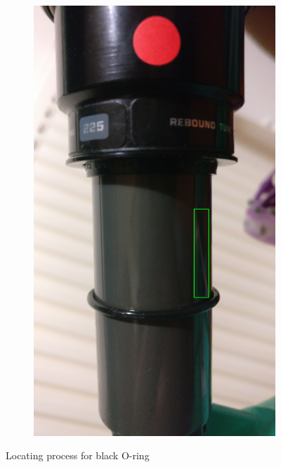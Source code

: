 \begin{figure}[h!]
\begin{subfigure}[t]{0.4\textwidth}
					\includegraphics[scale=0.04]{../images/results/fox_oring.jpg}	
					\label{subfig:fox_oring}
				\end{subfigure}
				\caption{Locating process for black O-ring}
				\label{fig:fox_oring}
			\end{figure}
